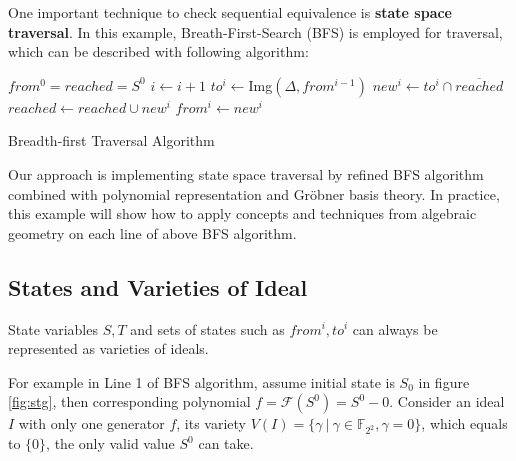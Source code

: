 One important technique to check sequential equivalence is \textbf{state space traversal}. In this example,
Breath-First-Search (BFS) is employed for traversal, which can be described with following algorithm:

\begin{algorithm}[hbt]
\SetAlgoNoLine

  $from^0 = reached = S^0$\;
  {
  	$i \gets i + 1$\;
	$to^i \gets$Img$(\Delta, from^{i-1})$\;
	$new^i \gets to^i \cap \overline{reached}$\;
  	$reached \gets reached \cup new^i$\;
	$from^i \gets new^i$\;
  }
\caption {Breadth-first Traversal Algorithm}\label{alg:BFS}
\end{algorithm}

Our approach is implementing state space traversal by refined BFS algorithm combined with polynomial representation
and Gr\"obner basis theory. In practice, this example will show how to apply concepts and techniques from algebraic
geometry on each line of above BFS algorithm.

\subsection{States and Varieties of Ideal}

\begin{Theorem}
State variables $S, T$ and sets of states such as $from^i, to^i$ can always be represented as varieties of ideals.
\end{Theorem}
For example in Line 1 of BFS algorithm, assume initial state is $S_0$ in figure \ref{fig:stg}, then corresponding
polynomial $f = \mathcal{F}(S^0) = S^0 - 0$. Consider an ideal $I$ with only one generator $f$, its variety
$V(I) = \{\gamma\ |\ \gamma \in \mathbb{F}_{2^2}, \gamma = 0\}$, which equals to $\{0\}$, the only
valid value $S^0$ can take.

